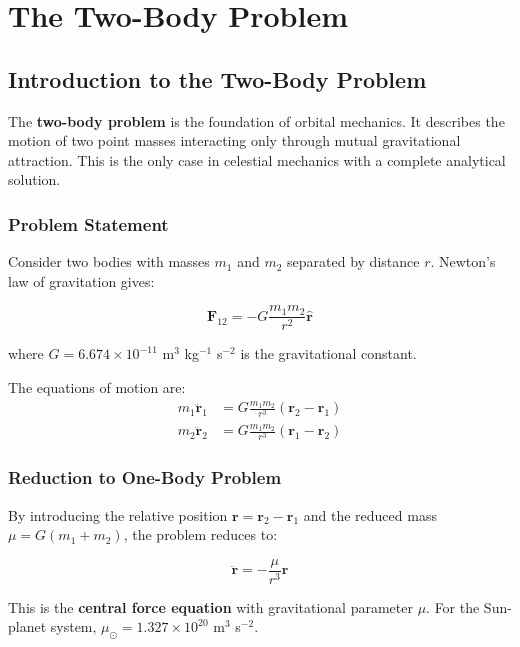 \chapter{The Two-Body Problem}
\label{ch:two_body_problem}

\section{Introduction to the Two-Body Problem}

The \textbf{two-body problem} is the foundation of orbital mechanics. It describes the motion of two point masses interacting only through mutual gravitational attraction. This is the only case in celestial mechanics with a complete analytical solution.

\subsection{Problem Statement}

Consider two bodies with masses $m_1$ and $m_2$ separated by distance $r$. Newton's law of gravitation gives:

\begin{equation}
    \mathbf{F}_{12} = -G\frac{m_1 m_2}{r^2}\hat{\mathbf{r}}
\end{equation}

where $G = 6.674 \times 10^{-11}$ m$^3$ kg$^{-1}$ s$^{-2}$ is the gravitational constant.

The equations of motion are:
\begin{align}
    m_1\ddot{\mathbf{r}}_1 &= G\frac{m_1 m_2}{r^3}(\mathbf{r}_2 - \mathbf{r}_1) \\
    m_2\ddot{\mathbf{r}}_2 &= G\frac{m_1 m_2}{r^3}(\mathbf{r}_1 - \mathbf{r}_2)
\end{align}

\subsection{Reduction to One-Body Problem}

By introducing the relative position $\mathbf{r} = \mathbf{r}_2 - \mathbf{r}_1$ and the reduced mass $\mu = G(m_1 + m_2)$, the problem reduces to:

\begin{equation}
    \ddot{\mathbf{r}} = -\frac{\mu}{r^3}\mathbf{r}
\end{equation}

This is the \textbf{central force equation} with gravitational parameter $\mu$. For the Sun-planet system, $\mu_\odot = 1.327 \times 10^{20}$ m$^3$ s$^{-2}$.

